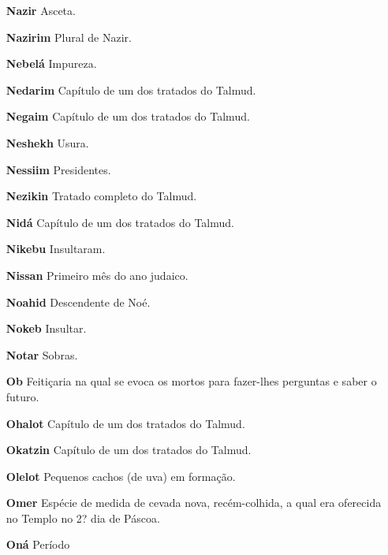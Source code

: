 \begin{itemize}
\item[\textbf{Nazir}] Asceta.

\item[\textbf{Nazirim}] Plural de Nazir.

\item[\textbf{Nebelá}] Impureza.

\item[\textbf{Nedarim}] Capítulo de um dos trata­dos do Talmud.

\item[\textbf{Negaim}] Capítulo de um dos tratados do Talmud.

\item[\textbf{Neshekh}] Usura.

\item[\textbf{Nessiim}] Presidentes.

\item[\textbf{Nezikin}] Tratado completo do Tal­mud.

\item[\textbf{Nidá}] Capítulo de um dos tratados do Talmud.

\item[\textbf{Nikebu}] Insultaram.

\item[\textbf{Nissan}] Primeiro mês do ano judai­co.

\item[\textbf{Noahid}] Descendente de Noé.

\item[\textbf{Nokeb}] Insultar.

\item[\textbf{Notar}] Sobras.

\item[\textbf{Ob}] Feitiçaria na qual se evoca os mor­tos para fazer-lhes
perguntas e saber o futuro.

\item[\textbf{Ohalot}] Capítulo de um dos tratados do Talmud.

\item[\textbf{Okatzin}] Capítulo de um dos tratados do Talmud.

\item[\textbf{Olelot}] Pequenos cachos (de uva) em formação.

\item[\textbf{Omer}] Espécie de medida de cevada nova, recém-colhida, a qual
era ofere­cida no Templo no 2? dia de Páscoa.

\item[\textbf{Oná}] Período


\end{itemize}
